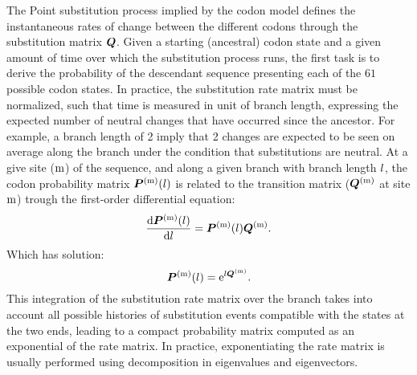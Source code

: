 The Point substitution process implied by the codon model defines the instantaneous rates of change between the different codons through the substitution matrix $\bm{Q}$.
Given a starting (ancestral) codon state and a given amount of time over which the substitution process runs, the first task is to derive the probability of the descendant sequence presenting each of the $61$ possible codon states.
In practice, the substitution rate matrix must be normalized, such that time is measured in unit of branch length, expressing the expected number of neutral changes that have occurred since the ancestor.
For example, a branch length of 2 imply that 2 changes are expected to be seen on average along the branch under the condition that substitutions are neutral.
At a give site ($\text{m}$) of the sequence, and along a given branch with branch length $l$, the codon probability matrix $\bm{P}^{(\text{m})}(l)$ is related to the transition matrix ($\bm{Q}^{(\text{m})}$ at site $\text{m}$) trough the first-order differential equation:
\begin{equation}
    \dfrac{\mathrm{d} \bm{P}^{(\text{m})}(l)}{\mathrm{d} l} = \bm{P}^{(\text{m})}(l) \bm{Q}^{(\text{m})}.
\end{equation}
Which has solution:
\begin{equation}
    \bm{P}^{(\text{m})}(l) = \mathrm{e}^{l \bm{Q}^{(\text{m})}}.
\end{equation}
This integration of the substitution rate matrix over the branch takes into account all possible histories of substitution events compatible with the states at the two ends, leading to a compact probability matrix computed as an exponential of the rate matrix.
In practice, exponentiating the rate matrix is usually performed using decomposition in eigenvalues and eigenvectors.

